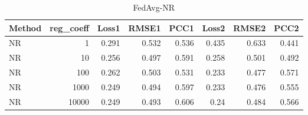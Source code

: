 \begin{table}
\caption{FedAvg-NR}
\begin{tabular}{lrrrrrrr}
\toprule
Method & reg_coeff & Loss1 & RMSE1 & PCC1 & Loss2 & RMSE2 & PCC2 \\
\midrule
NR & 1 & 0.291 & 0.532 & 0.536 & 0.435 & 0.633 & 0.441 \\
NR & 10 & 0.256 & 0.497 & 0.591 & 0.258 & 0.501 & 0.492 \\
NR & 100 & 0.262 & 0.503 & 0.531 & 0.233 & 0.477 & 0.571 \\
NR & 1000 & 0.249 & 0.494 & 0.597 & 0.233 & 0.476 & 0.555 \\
NR & 10000 & 0.249 & 0.493 & 0.606 & 0.24 & 0.484 & 0.566 \\
\bottomrule
\end{tabular}
\end{table}
